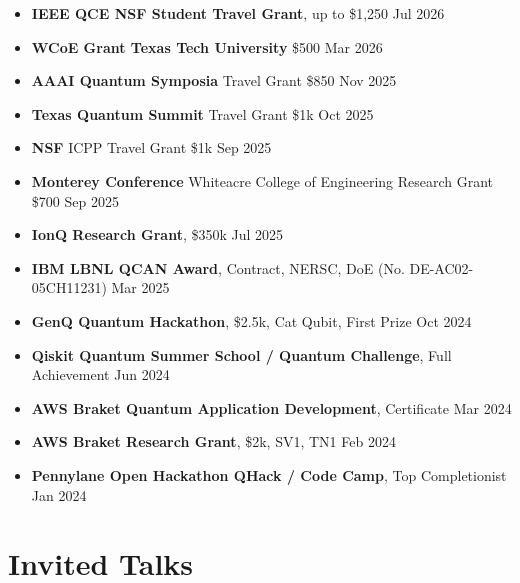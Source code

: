 \documentclass[10pt, letterpaper]{article}
\newenvironment{bulletentries}{%
    \begin{itemize}[topsep=0.10cm, parsep=0.10cm, partopsep=0pt, itemsep=0pt,
                    leftmargin=10pt]
}{%
    \end{itemize}%
}
\begin{document}
\begin{bulletentries}
\item \textbf{IEEE QCE NSF Student Travel Grant}, up to \$1,250 \hfill Jul 2026
\item \textbf{WCoE Grant Texas Tech University} \$500 \hfill Mar 2026
\item \textbf{AAAI Quantum Symposia} Travel Grant \$850 \hfill Nov 2025
\item \textbf{Texas Quantum Summit} Travel Grant \$1k \hfill Oct 2025
\item \textbf{NSF} ICPP Travel Grant \$1k \hfill Sep 2025
\item \textbf{Monterey Conference} Whiteacre College of Engineering Research Grant \$700 \hfill Sep 2025
\item \textbf{IonQ Research Grant}, \$350k \hfill Jul 2025
\item \textbf{IBM LBNL QCAN Award}, Contract, NERSC, DoE (No. DE-AC02-05CH11231) \hfill Mar 2025
\item \textbf{GenQ Quantum Hackathon}, \$2.5k, Cat Qubit, First Prize \hfill Oct 2024
\item \textbf{Qiskit Quantum Summer School / Quantum Challenge}, Full Achievement \hfill Jun 2024
\item \textbf{AWS Braket Quantum Application Development}, Certificate \hfill Mar 2024
\item \textbf{AWS Braket Research Grant}, \$2k, SV1, TN1 \hfill Feb 2024
\item \textbf{Pennylane Open Hackathon QHack / Code Camp}, Top Completionist \hfill Jan 2024
\end{bulletentries}

\section{Invited Talks}
\end{document}
